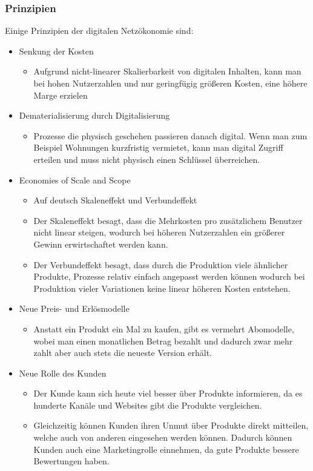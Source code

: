 \documentclass{article}
\begin{document}
	\subsubsection{Prinzipien}
	Einige Prinzipien der digitalen Netzökonomie sind:
	\begin{itemize}
		\item{Senkung der Kosten}
		\begin{itemize}
			\item{Aufgrund nicht-linearer Skalierbarkeit von digitalen Inhalten, kann man bei hohen Nutzerzahlen und nur geringfügig größeren Kosten, eine höhere Marge erzielen}
		\end{itemize}
		\item{Dematerialisierung durch Digitalisierung}
		\begin{itemize}
			\item{Prozesse die physisch geschehen passieren danach digital. Wenn man zum Beispiel Wohnungen kurzfristig vermietet, kann man digital Zugriff erteilen und muss nicht physisch einen Schlüssel überreichen.}			
		\end{itemize}
		\item{Economies of Scale and Scope}
		\begin{itemize}
			\item{Auf deutsch Skaleneffekt und Verbundeffekt}
				\item{Der Skaleneffekt besagt, dass die Mehrkosten pro zusätzlichem Benutzer nicht linear steigen, wodurch bei höheren Nutzerzahlen ein größerer Gewinn erwirtschaftet werden kann.}
				\item{Der Verbundeffekt besagt, dass durch die Produktion viele ähnlicher Produkte, Prozesse relativ einfach angepasst werden können wodurch bei Produktion vieler Variationen keine linear höheren Kosten entstehen.}
		\end{itemize}
		\item{Neue Preis- und Erlösmodelle}
		\begin{itemize}
			\item{Anstatt ein Produkt ein Mal zu kaufen, gibt es vermehrt Abomodelle, wobei man einen monatlichen Betrag bezahlt und dadurch zwar mehr zahlt aber auch stets die neueste Version erhält.}
		\end{itemize}
		\item{Neue Rolle des Kunden}
		\begin{itemize}
			\item{Der Kunde kann sich heute viel besser über Produkte informieren, da es hunderte Kanäle und Websites gibt die Produkte vergleichen.}
			\item{Gleichzeitig können Kunden ihren Unmut über Produkte direkt mitteilen, welche auch von anderen eingesehen werden können. Dadurch können Kunden auch eine Marketingrolle einnehmen, da gute Produkte bessere Bewertungen haben.}
		\end{itemize}

\end{itemize}
\end{document}
